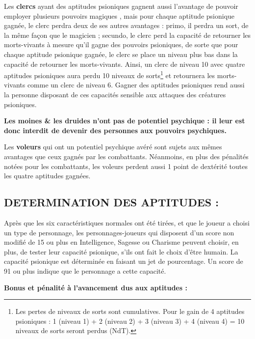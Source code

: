 \documentclass[12pt]{article}
\begin{document}
{\bigskip

Les \textbf{clercs} ayant des aptitudes psioniques gagnent aussi l'avantage de pouvoir employer plusieurs pouvoirs \og magiques \fg{}, mais pour chaque aptitude psionique gagnée, le clerc perdra deux de ses autres avantages : primo, il perdra un sort, de la même façon que le magicien ; secundo, le clerc perd la capacité de retourner les morts-vivants à mesure qu'il gagne des pouvoirs  psioniques, de sorte que pour chaque aptitude psionique gagnée, le clerc se place un niveau plus bas dans la capacité de retourner les morts-vivants. Ainsi, un clerc de niveau 10 avec quatre aptitudes psioniques aura perdu 10 niveaux de sorts\footnote{Les pertes de niveaux de sorts sont cumulatives. Pour le gain de 4 aptitudes psioniques : 1 (niveau 1) + 2 (niveau 2) + 3 (niveau 3) + 4 (niveau 4) = 10 niveaux de sorts seront perdus (NdT).} et retournera les morts-vivants comme un clerc de niveau 6. Gagner des aptitudes psioniques rend aussi la personne disposant de ces capacités sensible aux attaques des créatures psioniques.

\bigskip

\textbf{Les moines \& les druides n'ont pas de potentiel psychique : il leur est donc interdit de devenir des personnes aux pouvoirs psychiques.}

\bigskip

Les \textbf{voleurs} qui ont un potentiel psychique avéré sont sujets aux mêmes avantages que ceux gagnés par les combattants. Néanmoins, en plus des pénalités notées pour les combattants, les voleurs perdent aussi 1 point de dextérité toutes les quatre aptitudes gagnées.

\subsection*{{\normalsize DETERMINATION DES APTITUDES :}}

\medskip

Après que les six caractéristiques normales ont été tirées, et que le joueur a choisi un type de personnage, les personnages-joueurs qui disposent d'un score non modifié de 15 ou plus en Intelligence, Sagesse ou Charisme peuvent choisir, en plus, de tester leur capacité psionique, s'ils ont fait le choix d'être humain. La capacité psionique est déterminée en faisant un jet de pourcentage. Un score de 91 ou plus indique que le personnage a cette capacité.

\bigskip

\textbf{Bonus et pénalité à l'avancement dus aux aptitudes :}

}
\end{document}
